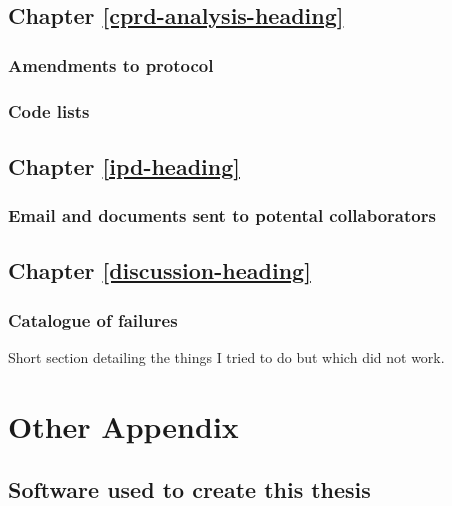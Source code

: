 \documentclass[a4paper, twoside]{templates/ociamthesis}
\begin{document}
\hypertarget{appendix-cprd-analysis}{%
\section{Chapter \ref{cprd-analysis-heading}}\label{appendix-cprd-analysis}}

\hypertarget{appendix-cprd-amendments}{%
\subsection{Amendments to protocol}\label{appendix-cprd-amendments}}

\hypertarget{code-lists}{%
\subsection{Code lists}\label{code-lists}}

\hypertarget{appendix-ipd-analysis}{%
\section{Chapter \ref{ipd-heading}}\label{appendix-ipd-analysis}}

\hypertarget{ipd-email-collab}{%
\subsection{Email and documents sent to potental collaborators}\label{ipd-email-collab}}

\hypertarget{chapter-refdiscussion-heading}{%
\section{Chapter \ref{discussion-heading}}\label{chapter-refdiscussion-heading}}

\hypertarget{catalogue-of-failures}{%
\subsection{Catalogue of failures}\label{catalogue-of-failures}}

Short section detailing the things I tried to do but which did not work.

\hypertarget{other-appendix-heading}{%
\chapter{Other Appendix}\label{other-appendix-heading}}

\hypertarget{software-used-to-create-this-thesis}{%
\section{Software used to create this thesis}\label{software-used-to-create-this-thesis}}
\end{document}
